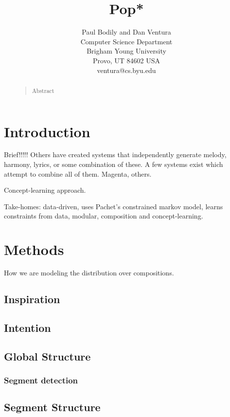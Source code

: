 \documentclass[letterpaper]{article}
\title{Pop*}
\author{Paul Bodily and Dan Ventura\\
Computer Science Department\\
Brigham Young University\\
Provo, UT 84602  USA\\
ventura@cs.byu.edu\\
}
\begin{document}
 
\maketitle
\begin{abstract}
\begin{quote}
Abstract
\end{quote}
\end{abstract}

\section{Introduction}

Brief!!!!! Others have created systems that independently generate melody, harmony, lyrics, or some combination of these. A few systems exist which attempt to combine all of them. Magenta, others.

Concept-learning approach.

Take-homes: data-driven, uses Pachet's constrained markov model, learns constraints from data, modular, composition and concept-learning.

\section{Methods}

How we are modeling the distribution over compositions. 

\subsection{Inspiration}

\subsection{Intention}

\subsection{Global Structure}

\subsubsection{Segment detection}

\subsection{Segment Structure}
\end{document}
